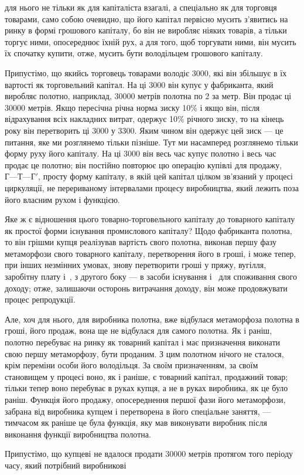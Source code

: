 \parcont{}  %
для нього не тільки як для капіталіста взагалі, а спеціально як
для торговця товарами, само собою очевидно, що його капітал
первісно мусить з’явитись на ринку в формі грошового капіталу,
бо він не виробляє ніяких товарів, а тільки торгує ними, опосереднює їхній рух, а для того, щоб
торгувати ними, він мусить
їх спочатку купити, отже, мусить бути володільцем грошового
капіталу.

Припустімо, що якийсь торговець товарами володіє 3000, які він збільшує в їх
вартості як торговельний
капітал. На ці 3000 він купує у фабриканта,
який виробляє полотно, наприклад, \num{30000} метрів полотна по
2 за метр. Він продає ці \num{30000} метрів. Якщо пересічна
річна норма зиску \deq{} 10\% і якщо він, після відрахування всіх
накладних витрат, одержує 10\% річного зиску, то на кінець року
він перетворить ці 3000 у 3300. Яким чином він одержує цей зиск
— це питання, яке ми
розглянемо тільки пізніше. Тут ми насамперед розглянемо тільки
форму руху його капіталу. На ці 3000 він
весь час купує полотно і весь час продає це полотно; він постійно повторює цю операцію купівлі для
продажу, $Г — Т — Г'$,
просту форму капіталу, в якій цей капітал цілком зв’язаний у процесі циркуляції, не перериваному
інтервалами процесу виробництва, який лежить поза його власним рухом і функцією.

Яке ж є відношення цього товарно-торговельного капіталу
до товарного капіталу як простої форми існування промислового
капіталу? Щодо фабриканта полотна, то він грішми купця реалізував вартість свого полотна, виконав
першу фазу метаморфози свого товарного капіталу, перетворення його в гроші, і може
тепер, при інших незмінних умовах, знову перетворити гроші
у пряжу, вугілля, заробітну плату і~, з другого боку — в засоби існування і~ для
споживання свого доходу; отже, залишаючи осторонь витрачання доходу, він може продовжувати процес
репродукції.

Але, хоч для нього, для виробника полотна, вже відбулася
метаморфоза полотна в гроші, його продаж, вона ще не відбулася для самого полотна. Як і раніш,
полотно перебуває на ринку
як товарний капітал і має призначення виконати свою першу
метаморфозу, бути проданим. З цим полотном нічого не сталося,
крім переміни особи його володільця. За своїм призначенням, за
своїм становищем у процесі воно, як і раніше, є товарний капітал, продажний товар; тільки тепер воно
перебуває в руках
купця, а не в руках виробника, як це було раніш. Функція його
продажу, опосереднення першої фази його метаморфози, забрана
від виробника купцем і перетворена в його спеціальне заняття, — тимчасом як раніше це була функція,
яку мав виконувати виробник після виконання функції виробництва полотна.

Припустімо, що купцеві не вдалося продати \num{30000} метрів
протягом того періоду часу, який потрібний виробникові
\parbreak{}  %
